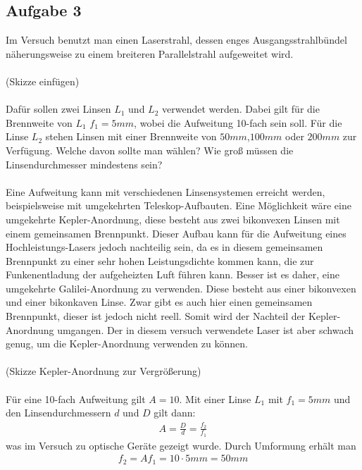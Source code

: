 \documentclass[a4paper,10pt]{scrartcl}
\begin{document}
		\subsection{Aufgabe 3}
			Im Versuch benutzt man einen Laserstrahl, dessen enges Ausgangsstrahlbündel näherungsweise zu einem breiteren Parallelstrahl aufgeweitet wird.\\
			\\
			(Skizze einfügen)\\
			\\
			Dafür sollen zwei Linsen \(L_{1}\) und \(L_{2}\) verwendet werden. Dabei gilt für die Brennweite von \(L_{1}\) \(f_{1}=5mm\), wobei die  Aufweitung 10-fach sein soll. Für die Linse \(L_{2}\) stehen Linsen mit einer Brennweite von \(50mm\),\(100mm\) oder \(200mm\) zur Verfügung. Welche davon sollte man wählen? Wie groß müssen die Linsendurchmesser mindestens sein?\\
			\\
			Eine Aufweitung kann mit verschiedenen Linsensystemen erreicht werden, beispielsweise mit umgekehrten Teleskop-Aufbauten. Eine Möglichkeit wäre eine umgekehrte Kepler-Anordnung, diese besteht aus zwei bikonvexen Linsen mit einem gemeinsamen Brennpunkt. Dieser Aufbau kann für die Aufweitung eines Hochleistungs-Lasers jedoch nachteilig sein, da es in diesem gemeinsamen Brennpunkt zu einer sehr hohen Leistungsdichte kommen kann, die zur Funkenentladung der aufgeheizten Luft führen kann. Besser ist es daher, eine umgekehrte Galilei-Anordnung zu verwenden. Diese besteht aus einer bikonvexen und einer bikonkaven Linse. Zwar gibt es auch hier einen gemeinsamen Brennpunkt, dieser ist jedoch nicht reell. 
			Somit wird der Nachteil der Kepler-Anordnung umgangen. Der in diesem versuch verwendete Laser ist aber schwach genug, um die Kepler-Anordnung verwenden zu können.\\
			\\
			(Skizze Kepler-Anordnung zur Vergrößerung)\\
			\\
			Für eine 10-fach Aufweitung gilt \(A=10\). Mit einer Linse \(L_{1}\) mit \(f_{1}=5mm\) und den Linsendurchmessern \(d\) und \(D\) gilt dann:
			\begin{align*}
			A=\frac{D}{d}=\frac{f_{2}}{f_{1}}
			\end{align*}
			was im Versuch zu optische Geräte gezeigt wurde. Durch Umformung erhält man
			\begin{align*}
			f_{2}=Af_{1}=10 \cdot 5mm=50mm
			\end{align*}
\end{document}

